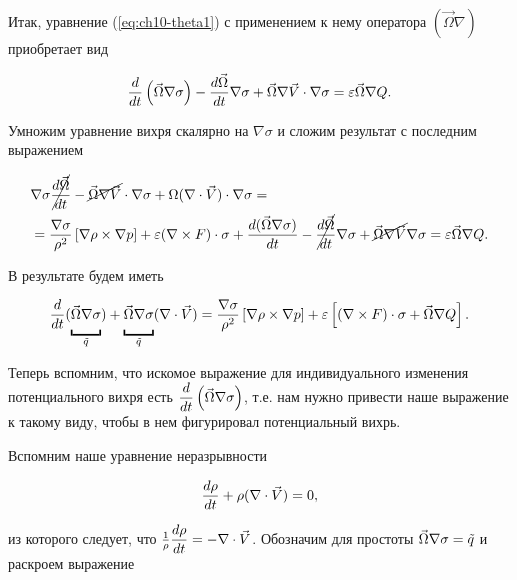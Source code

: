 Итак, уравнение (\ref{eq:ch10-theta1}) с применением к нему оператора $(\vec{\Omega}\nabla)$ приобретает вид

\begin{equation}
    \label{eq:ch10-theta4}
    \displaystyle\frac{d }{d t} \displaystyle \left(  \vec{\Omega}\nabla\sigma  \right) - 
    \displaystyle\frac{d \vec{\Omega}}{d t}\nabla\sigma + 
    \vec{\Omega}\nabla\vec{V}\cdot\nabla\sigma = 
    \varepsilon\vec{\Omega}\nabla Q.
\end{equation}

Умножим уравнение вихря скалярно на $\nabla\sigma$ и сложим результат с последним выражением

\begin{align*}
  & \nabla\sigma \cancel{ \displaystyle\frac{d \vec{\Omega}}{d t} } - 
    \cancel{  \vec{\Omega}\nabla\vec{V} } \cdot\nabla\sigma + 
    \Omega(\nabla\cdot\vec{V})\cdot\nabla\sigma = \\ 
 &= \frac{\nabla\sigma}{\rho^2} \displaystyle \left[  \nabla\rho \times \nabla p  \right] + 
    \varepsilon (\nabla\times F) \cdot\sigma + 
    \displaystyle\frac{d (\vec{\Omega}\nabla\sigma)}{d t} - 
    \cancel{ \displaystyle\frac{d \vec{\Omega}}{d t} } \nabla\sigma + 
    \cancel{ \vec{\Omega}\nabla\vec{V}} \nabla\sigma =  
    \varepsilon\vec{\Omega}\nabla Q.
\end{align*}

В результате будем иметь

\begin{equation}
    \label{eq:ch10-theta5}
    \td{}{t} ( \underbracket{\vphantom{\td{}{t}}\vec{\Omega}\nabla\sigma}_{\Tilde{q}} ) + 
    \underbracket{\vphantom{\td{}{t}}\vec{\Omega}\nabla\sigma}_{\Tilde{q}}(\nabla\cdot\vec{V}) = 
    \frac{\nabla\sigma}{\rho^2} \qb{ \nabla\rho\times\nabla p } + 
    \varepsilon \qb{ (\nabla\times F)\cdot\sigma + \vec{\Omega}\nabla Q }.
\end{equation}

Теперь вспомним, что искомое выражение для индивидуального изменения потенциального вихря есть $\displaystyle\frac{d }{d t} \displaystyle \left( \vec{\Omega}\nabla\sigma \right) $, т.е. нам нужно привести наше выражение к такому виду, чтобы в нем фигурировал потенциальный вихрь.

Вспомним наше уравнение неразрывности 

\begin{equation*}
    \displaystyle\frac{d \rho}{d t} + \rho (\nabla\cdot\vec{V}) = 0,
\end{equation*}

из которого следует, что $\frac{1}{\rho}\displaystyle\frac{d \rho}{d t}=-\nabla\cdot\vec{V}$. Обозначим для простоты $\vec{\Omega}\nabla\sigma=\Tilde{q}$ и раскроем выражение 

